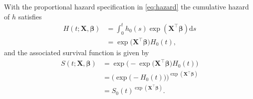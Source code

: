 \documentclass[11pt]{article}
\newcommand{\X}{\mathbf{X}}
\renewcommand{\b}{\bm{\beta}}
\renewcommand{\d}{\text{d}}
\begin{document}
With the proportional hazard specification in \eqref{eq:hazard} the cumulative hazard of $h$ satisfies
\begin{equation*}
\begin{split}
    H(t ; \X, \b) &= \int^t_0 h_0(s) \exp \left(\X^\top \b \right) \d s
    \\
    &= \exp \big(\X^\top \b \big) H_0(t),
\end{split}
\end{equation*}
and the associated survival function is given by
\begin{equation} \label{eq:cox-survival}
\begin{split}
    S(t ; \X, \b) 
    &=
    \exp\Big( - \exp\big( \X^\top \b \big) H_0(t)  \Big)
    \\&=
    \Big(\exp\big( - H_0(t) \big) \Big)^{\exp(\X^\top \b)}
    \\&=
    S_0(t)^{\exp(\X^\top \b)}.
\end{split}
\end{equation}
\end{document}
